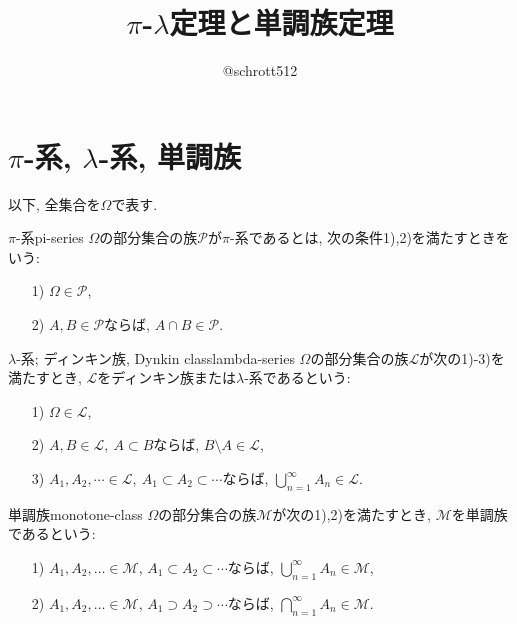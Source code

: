 

\title{$\pi$-$\lambda$定理と単調族定理}
\author{@schrott512}
\date{}



\maketitle

\section{$\pi$-系, $\lambda$-系, 単調族}
以下, 全集合を$\Omega$で表す.

\begin{definition}{$\pi$-系}{pi-series}
    $\Omega$の部分集合の族$\mathcal{P}$が$\pi$-系であるとは, 次の条件1),2)を満たすときをいう:
    \begin{itemize}
        \item[1)] $\Omega \in \mathcal{P}$,
        \item[2)] $A,B\in \mathcal{P}$ならば, $A\cap B\in \mathcal{P}$.
    \end{itemize}
\end{definition}

\begin{definition}{$\lambda$-系; ディンキン族, Dynkin class}{lambda-series}
    $\Omega$の部分集合の族$\mathcal{L}$が次の1)-3)を満たすとき, $\mathcal{L}$をディンキン族または$\lambda$-系であるという:
    \begin{itemize}
        \item[1)] $\Omega \in \mathcal{L}$,
        \item[2)] $A,B\in \mathcal{L},~A\subset B$ならば, $B\setminus A\in \mathcal{L}$,
        \item[3)] $A_1,A_2,\cdots \in \mathcal{L},~A_1 \subset A_2 \subset \cdots$ならば, $\bigcup_{n=1}^\infty A_n \in \mathcal{L}$.
    \end{itemize}
\end{definition}

\begin{definition}{単調族}{monotone-class}
    $\Omega$の部分集合の族$\mathcal{M}$が次の1),2)を満たすとき, $\mathcal{M}$を単調族であるという:
    \begin{itemize}
        \item[1)] $A_1,A_2,\dots\in\mathcal{M}$, $A_1\subset A_2\subset\cdots$ならば, $\bigcup_{n=1}^\infty A_n\in\mathcal{M}$,
        \item[2)] $A_1,A_2,\dots\in\mathcal{M}$, $A_1\supset A_2\supset\cdots$ならば, $\bigcap_{n=1}^\infty A_n\in\mathcal{M}$.
    \end{itemize}
\end{definition}

